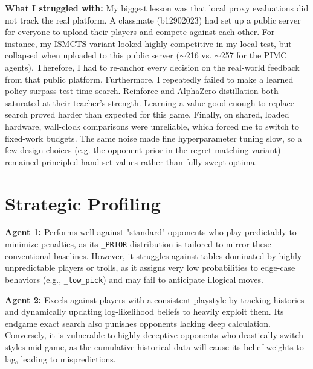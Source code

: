\documentclass{article}
\begin{document}
\noindent \textbf{What I struggled with:} My biggest lesson was that local proxy evaluations did not track the real platform. A classmate (b12902023) had set up a public server for everyone to upload their players and compete against each other. For instance, my ISMCTS variant looked highly competitive in my local test, but collapsed when uploaded to this public server ($\sim$216 vs. $\sim$257 for the PIMC agents). Therefore, I had to re-anchor every decision on the real-world feedback from that public platform. Furthermore, I repeatedly failed to make a learned policy surpass test-time search. Reinforce and AlphaZero distillation both saturated at their teacher's strength. Learning a value good enough to replace search proved harder than expected for this game. Finally, on shared, loaded hardware, wall-clock comparisons were unreliable, which forced me to switch to fixed-work budgets. The same noise made fine hyperparameter tuning slow, so a few design choices (e.g. the opponent prior in the regret-matching variant) remained principled hand-set values rather than fully swept optima.

\section{Strategic Profiling}
\textbf{Agent 1:} Performs well against "standard" opponents who play predictably to minimize penalties, as its \texttt{\_PRIOR} distribution is tailored to mirror these conventional baselines. However, it struggles against tables dominated by highly unpredictable players or trolls, as it assigns very low probabilities to edge-case behaviors (e.g., \texttt{\_low\_pick}) and may fail to anticipate illogical moves.

 \noindent \textbf{Agent 2:} Excels against players with a consistent playstyle by tracking histories and dynamically updating log-likelihood beliefs to heavily exploit them. Its endgame exact search also punishes opponents lacking deep calculation. Conversely, it is vulnerable to highly deceptive opponents who drastically switch styles mid-game, as the cumulative historical data will cause its belief weights to lag, leading to mispredictions.
\end{document}
